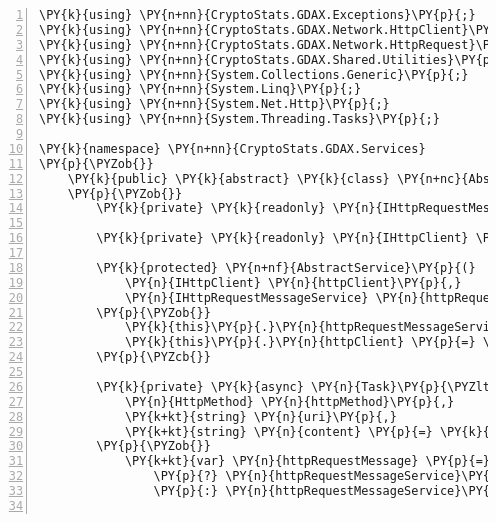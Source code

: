 \def\PYZbs{\char`\\}
\def\PYZus{\char`\_}
\def\PYZob{\char`\{}
\def\PYZcb{\char`\}}
\def\PYZca{\char`\^}
\def\PYZam{\char`\&}
\def\PYZlt{\char`\<}
\def\PYZgt{\char`\>}
\def\PYZsh{\char`\#}
\def\PYZpc{\char`\%}
\def\PYZdl{\char`\$}
\def\PYZhy{\char`\-}
\def\PYZsq{\char`\'}
\def\PYZdq{\char`\"}
\def\PYZti{\char`\~}
\def\PYZat{@}
\def\PYZlb{[}
\def\PYZrb{]}
\makeatother\begin{Verbatim}[commandchars=\\\{\},numbers=left,firstnumber=1,stepnumber=1,numberblanklines=0]
\PY{k}{using} \PY{n+nn}{CryptoStats.GDAX.Exceptions}\PY{p}{;}
\PY{k}{using} \PY{n+nn}{CryptoStats.GDAX.Network.HttpClient}\PY{p}{;}
\PY{k}{using} \PY{n+nn}{CryptoStats.GDAX.Network.HttpRequest}\PY{p}{;}
\PY{k}{using} \PY{n+nn}{CryptoStats.GDAX.Shared.Utilities}\PY{p}{;}
\PY{k}{using} \PY{n+nn}{System.Collections.Generic}\PY{p}{;}
\PY{k}{using} \PY{n+nn}{System.Linq}\PY{p}{;}
\PY{k}{using} \PY{n+nn}{System.Net.Http}\PY{p}{;}
\PY{k}{using} \PY{n+nn}{System.Threading.Tasks}\PY{p}{;}

\PY{k}{namespace} \PY{n+nn}{CryptoStats.GDAX.Services}
\PY{p}{\PYZob{}}
    \PY{k}{public} \PY{k}{abstract} \PY{k}{class} \PY{n+nc}{AbstractService}
    \PY{p}{\PYZob{}}
        \PY{k}{private} \PY{k}{readonly} \PY{n}{IHttpRequestMessageService} \PY{n}{httpRequestMessageService}\PY{p}{;}

        \PY{k}{private} \PY{k}{readonly} \PY{n}{IHttpClient} \PY{n}{httpClient}\PY{p}{;}

        \PY{k}{protected} \PY{n+nf}{AbstractService}\PY{p}{(}
            \PY{n}{IHttpClient} \PY{n}{httpClient}\PY{p}{,}
            \PY{n}{IHttpRequestMessageService} \PY{n}{httpRequestMessageService}\PY{p}{)}
        \PY{p}{\PYZob{}}
            \PY{k}{this}\PY{p}{.}\PY{n}{httpRequestMessageService} \PY{p}{=} \PY{n}{httpRequestMessageService}\PY{p}{;}
            \PY{k}{this}\PY{p}{.}\PY{n}{httpClient} \PY{p}{=} \PY{n}{httpClient}\PY{p}{;}
        \PY{p}{\PYZcb{}}

        \PY{k}{private} \PY{k}{async} \PY{n}{Task}\PY{p}{\PYZlt{}}\PY{n}{HttpResponseMessage}\PY{p}{\PYZgt{}} \PY{n}{SendHttpRequestMessageAsync}\PY{p}{(}
            \PY{n}{HttpMethod} \PY{n}{httpMethod}\PY{p}{,}
            \PY{k+kt}{string} \PY{n}{uri}\PY{p}{,}
            \PY{k+kt}{string} \PY{n}{content} \PY{p}{=} \PY{k}{null}\PY{p}{)}
        \PY{p}{\PYZob{}}
            \PY{k+kt}{var} \PY{n}{httpRequestMessage} \PY{p}{=} \PY{n}{content} \PY{p}{=}\PY{p}{=} \PY{k}{null}
                \PY{p}{?} \PY{n}{httpRequestMessageService}\PY{p}{.}\PY{n}{CreateHttpRequestMessage}\PY{p}{(}\PY{n}{httpMethod}\PY{p}{,} \PY{n}{uri}\PY{p}{)}
                \PY{p}{:} \PY{n}{httpRequestMessageService}\PY{p}{.}\PY{n}{CreateHttpRequestMessage}\PY{p}{(}\PY{n}{httpMethod}\PY{p}{,} \PY{n}{uri}\PY{p}{,} \PY{n}{content}\PY{p}{)}\PY{p}{;}


\end{Verbatim}
